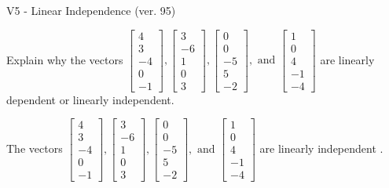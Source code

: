 \begin{exercise}
  \begin{exerciseTitle}V5 - Linear Independence (ver. 95)\end{exerciseTitle}
  \begin{exerciseStatement}
    Explain why the vectors \(\left[\begin{array}{r}
4 \\
3 \\
-4 \\
0 \\
-1
\end{array}\right] , \left[\begin{array}{r}
3 \\
-6 \\
1 \\
0 \\
3
\end{array}\right] , \left[\begin{array}{r}
0 \\
0 \\
-5 \\
5 \\
-2
\end{array}\right] , \text{ and } \left[\begin{array}{r}
1 \\
0 \\
4 \\
-1 \\
-4
\end{array}\right]\) are linearly dependent or linearly independent.	


  \end{exerciseStatement}
  \begin{exerciseAnswer}
   The vectors \(\left[\begin{array}{r}
4 \\
3 \\
-4 \\
0 \\
-1
\end{array}\right] , \left[\begin{array}{r}
3 \\
-6 \\
1 \\
0 \\
3
\end{array}\right] , \left[\begin{array}{r}
0 \\
0 \\
-5 \\
5 \\
-2
\end{array}\right] , \text{ and } \left[\begin{array}{r}
1 \\
0 \\
4 \\
-1 \\
-4
\end{array}\right]\) are 
  	 linearly independent  .
  


  \end{exerciseAnswer}
\end{exercise}
